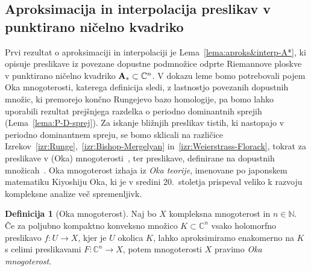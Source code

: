 \documentclass[12pt,a4paper,twoside]{article}
\theoremstyle{definition} %
\newtheorem{definicija}{Definicija}[section]
\theoremstyle{plain} %
\numberwithin{equation}{section}  %
\begin{document}
\subsection{Aproksimacija in interpolacija preslikav v punktirano ničelno kvadriko}
%
Prvi rezultat o aproksimaciji in interpolaciji je Lema~\ref{lema:aproks&interp-A*}, ki opisuje preslikave iz povezane dopustne podmnožice odprte Riemannove ploskve v punktirano ničelno kvadriko $\textbf{\textup{A}}_{*} \subset \mathbb{C}^{n}$.
V dokazu leme bomo potrebovali pojem Oka mnogoterosti, katerega definicija sledi, z lastnostjo povezanih dopustnih množic, ki premorejo končno Rungejevo bazo homologije, pa bomo lahko uporabili rezultat prejšnjega razdelka o periodno dominantnih sprejih (Lema~\ref{lema:P-D-sprej}).
Za iskanje bližnjih preslikav tistih, ki nastopajo v periodno dominantnem spreju, se bomo sklicali na različice Izrekov~\ref{izr:Runge},~\ref{izr:Bishop-Mergelyan} in~\ref{izr:Weierstrass-Florack}, tokrat za preslikave v (Oka) mnogoterosti~\cite[Theorem~1.13.1,~1.13.3]{alarcon2021minimal},
ter preslikave, definirane na dopustnih množicah~\cite[Theorem~1.12.11]{alarcon2021minimal}.
Oka mnogoterost izhaja iz \emph{Oka teorije}, imenovane po japonskem matematiku Kiyoshiju Oka, ki je v sredini 20.~stoletja prispeval veliko k razvoju kompleksne analize več spremenljivk.

\begin{definicija} [Oka mnogoterost]
Naj bo $X$ kompleksna mnogoterost in $n \in \mathbb{N}$. Če za poljubno kompaktno konveksno množico $K \subset \mathbb{C}^{n}$ vsako holomorfno preslikavo $f \colon U \to X$, kjer je $U$ okolica $K$, lahko aproksimiramo enakomerno na $K$ s celimi preslikavami $F \colon \mathbb{C}^{n} \to X$, potem mnogoterosti $X$ pravimo \emph{Oka mnogoterost}.
\end{definicija}
\end{document}

